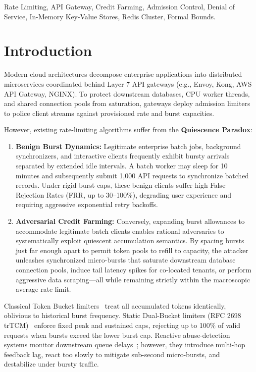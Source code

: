\documentclass[conference]{IEEEtran}
\begin{document}
\begin{IEEEkeywords}
Rate Limiting, API Gateway, Credit Farming, Admission Control, Denial of Service, In-Memory Key-Value Stores, Redis Cluster, Formal Bounds.
\end{IEEEkeywords}

\section{Introduction}

Modern cloud architectures decompose enterprise applications into distributed microservices coordinated behind Layer 7 API gateways (e.g., Envoy, Kong, AWS API Gateway, NGINX). To protect downstream databases, CPU worker threads, and shared connection pools from saturation, gateways deploy admission limiters to police client streams against provisioned rate and burst capacities.

However, existing rate-limiting algorithms suffer from the \textbf{Quiescence Paradox}:
\begin{enumerate}
    \item \textbf{Benign Burst Dynamics:} Legitimate enterprise batch jobs, background synchronizers, and interactive clients frequently exhibit bursty arrivals separated by extended idle intervals. A batch worker may sleep for 10 minutes and subsequently submit 1,000 API requests to synchronize batched records. Under rigid burst caps, these benign clients suffer high False Rejection Rates (FRR, up to 30--100\%), degrading user experience and requiring aggressive exponential retry backoffs.
    \item \textbf{Adversarial Credit Farming:} Conversely, expanding burst allowances to accommodate legitimate batch clients enables rational adversaries to systematically exploit quiescent accumulation semantics. By spacing bursts just far enough apart to permit token pools to refill to capacity, the attacker unleashes synchronized micro-bursts that saturate downstream database connection pools, induce tail latency spikes for co-located tenants, or perform aggressive data scraping---all while remaining strictly within the macroscopic average rate limit.
\end{enumerate}

Classical Token Bucket limiters~\cite{turner1986new,rfc2212} treat all accumulated tokens identically, oblivious to historical burst frequency. Static Dual-Bucket limiters (RFC 2698 trTCM)~\cite{rfc2698} enforce fixed peak and sustained caps, rejecting up to 100\% of valid requests when bursts exceed the lower burst cap. Reactive abuse-detection systems monitor downstream queue delays~\cite{nichols2012controlling}; however, they introduce multi-hop feedback lag, react too slowly to mitigate sub-second micro-bursts, and destabilize under bursty traffic.
\end{document}
